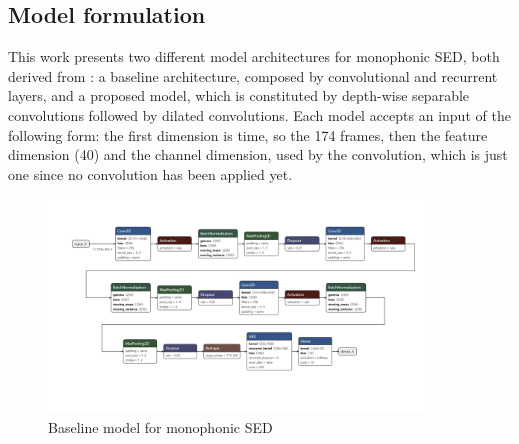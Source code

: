 \documentclass{article}
\begin{document}
\subsection{Model formulation}
\label{subsec:mono_model}

This work presents two different model architectures for monophonic SED, both derived from \cite{drossos2020sound}: a baseline architecture, composed by convolutional and recurrent layers, and a proposed model, which is constituted by depth-wise separable convolutions followed by dilated convolutions.\newline
Each model accepts an input of the following form: the first dimension is time, so the 174 frames, then the feature dimension (40) and the channel dimension, used by the convolution, which is just one since no convolution has been applied yet.

\begin{figure}[H]
	\centering
	\includegraphics[width=0.9\textwidth]{./images/mono/baseline.png}	
	\caption{Baseline model for monophonic SED}
	\label{fig:mono_baseline}
\end{figure}
\end{document}
